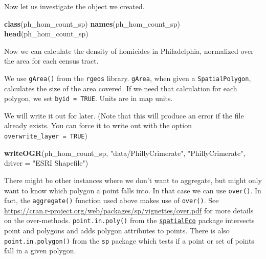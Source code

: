 \documentclass[]{book}
\newenvironment{Shaded}{\begin{snugshade}}{\end{snugshade}}
\newcommand{\KeywordTok}[1]{\textcolor[rgb]{0.13,0.29,0.53}{\textbf{#1}}}
\newcommand{\DataTypeTok}[1]{\textcolor[rgb]{0.13,0.29,0.53}{#1}}
\newcommand{\FloatTok}[1]{\textcolor[rgb]{0.00,0.00,0.81}{#1}}
\newcommand{\StringTok}[1]{\textcolor[rgb]{0.31,0.60,0.02}{#1}}
\newcommand{\CommentTok}[1]{\textcolor[rgb]{0.56,0.35,0.01}{\textit{#1}}}
\newcommand{\OtherTok}[1]{\textcolor[rgb]{0.56,0.35,0.01}{#1}}
\newcommand{\OperatorTok}[1]{\textcolor[rgb]{0.81,0.36,0.00}{\textbf{#1}}}
\newcommand{\NormalTok}[1]{#1}
\begin{document}
Now let us investigate the object we created.

\begin{Shaded}
\begin{Highlighting}[]
\KeywordTok{class}\NormalTok{(ph_hom_count_sp)}
\KeywordTok{names}\NormalTok{(ph_hom_count_sp)}
\KeywordTok{head}\NormalTok{(ph_hom_count_sp)}
\end{Highlighting}
\end{Shaded}

Now we can calculate the density of homicides in Philadelphia,
normalized over the area for each census tract.

We use \texttt{gArea()} from the \texttt{rgeos} library. \texttt{gArea},
when given a \texttt{SpatialPolygon}, calculates the size of the area
covered. If we need that calculation for each polygon, we set
\texttt{byid\ =\ TRUE}. Units are in map units.

\begin{Shaded}
\end{Shaded}

We will write it out for later. (Note that this will produce an error if
the file already exists. You can force it to write out with the option
\texttt{overwrite\_layer\ =\ TRUE})

\begin{Shaded}
\begin{Highlighting}[]
\KeywordTok{writeOGR}\NormalTok{(ph_hom_count_sp, }\StringTok{"data/PhillyCrimerate"}\NormalTok{, }\StringTok{"PhillyCrimerate"}\NormalTok{, }\DataTypeTok{driver =} \StringTok{"ESRI Shapefile"}\NormalTok{)}
\end{Highlighting}
\end{Shaded}

There might be other instances where we don't want to aggregate, but
might only want to know which polygon a point falls into. In that case
we can use \texttt{over()}. In fact, the \texttt{aggregate()} function
used above makes use of \texttt{over()}. See
\url{https://cran.r-project.org/web/packages/sp/vignettes/over.pdf} for
more details on the over-methods. \texttt{point.in.poly()} from the
\href{https://cran.r-project.org/package=spatialEco}{\texttt{spatialEco}}
package intersects point and polygons and adds polygon attributes to
points. There is also \texttt{point.in.polygon()} from the \texttt{sp}
package which tests if a point or set of points fall in a given polygon.
\end{document}
